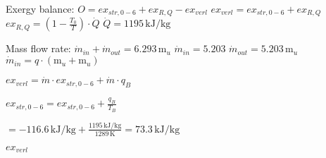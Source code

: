 Exergy balance:  
\( O = ex_{str,0-6} + ex_{R,Q} - ex_{verl} \)  
\( ex_{verl} = ex_{str,0-6} + ex_{R,Q} \)  
\( ex_{R,Q} = \left( 1 - \frac{T_0}{T} \right) \cdot \dot{Q} \)  
\( \dot{Q} = 1195 \, \text{kJ/kg} \)  

Mass flow rate:  
\( \dot{m}_{in} + \dot{m}_{out} = 6.293 \, \text{m}_u \)  
\( \dot{m}_{in} = 5.203 \)  
\( \dot{m}_{out} = 5.203 \, \text{m}_u \)  
\( \dot{m}_{in} = q \cdot (\text{m}_u + \text{m}_u) \)

\( ex_{verl} = \dot{m} \cdot ex_{str,0-6} + \dot{m} \cdot q_B \)  

\( ex_{str,0-6} = ex_{str,0-6} + \frac{q_B}{T_B} \)  

\( = -116.6 \, \text{kJ/kg} + \frac{1195 \, \text{kJ/kg}}{1289 \, \text{K}} = 73.3 \, \text{kJ/kg} \)  

\( ex_{verl} \)